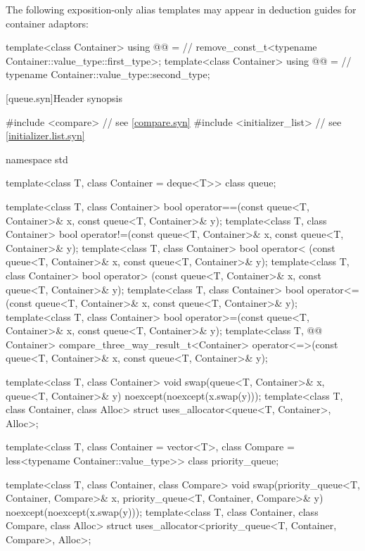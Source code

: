 \pnum
The following exposition-only alias templates may appear in deduction guides
for container adaptors:
\begin{codeblock}
template<class Container>
  using @@ =                                // \expos
    remove_const_t<typename Container::value_type::first_type>;
template<class Container>
  using @@ =                             // \expos
    typename Container::value_type::second_type;
\end{codeblock}

[queue.syn]{Header  synopsis}

\begin{codeblock}
#include <compare>              // see \ref{compare.syn}
#include <initializer_list>     // see \ref{initializer.list.syn}

namespace std {
  template<class T, class Container = deque<T>> class queue;

  template<class T, class Container>
    bool operator==(const queue<T, Container>& x, const queue<T, Container>& y);
  template<class T, class Container>
    bool operator!=(const queue<T, Container>& x, const queue<T, Container>& y);
  template<class T, class Container>
    bool operator< (const queue<T, Container>& x, const queue<T, Container>& y);
  template<class T, class Container>
    bool operator> (const queue<T, Container>& x, const queue<T, Container>& y);
  template<class T, class Container>
    bool operator<=(const queue<T, Container>& x, const queue<T, Container>& y);
  template<class T, class Container>
    bool operator>=(const queue<T, Container>& x, const queue<T, Container>& y);
  template<class T, @@ Container>
    compare_three_way_result_t<Container>
      operator<=>(const queue<T, Container>& x, const queue<T, Container>& y);

  template<class T, class Container>
    void swap(queue<T, Container>& x, queue<T, Container>& y) noexcept(noexcept(x.swap(y)));
  template<class T, class Container, class Alloc>
    struct uses_allocator<queue<T, Container>, Alloc>;

  template<class T, class Container = vector<T>,
           class Compare = less<typename Container::value_type>>
    class priority_queue;

  template<class T, class Container, class Compare>
    void swap(priority_queue<T, Container, Compare>& x,
              priority_queue<T, Container, Compare>& y) noexcept(noexcept(x.swap(y)));
  template<class T, class Container, class Compare, class Alloc>
    struct uses_allocator<priority_queue<T, Container, Compare>, Alloc>;
}
\end{codeblock}

